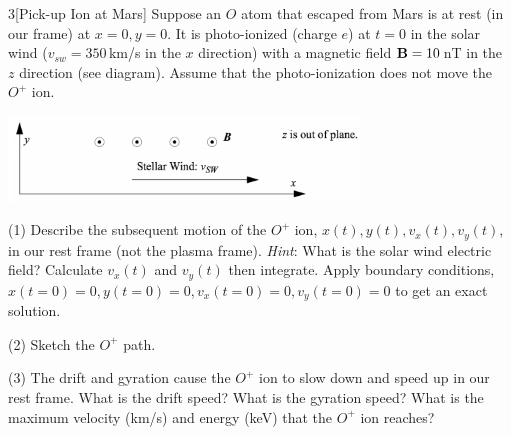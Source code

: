 \documentclass[12pt]{article}
\begin{document}
\begin{problem}{3}[Pick-up Ion at Mars]
Suppose an $O$ atom that escaped from Mars is at rest (in our frame) at
$x=0,y=0$. It is photo-ionized (charge $e$) at $t=0$ in the solar wind
($v_{sw}=350$\,\si{km/s} in the $x$ direction) with a magnetic field
$\vb{B}=10$\,\si{nT} in the $z$ direction (see diagram). Assume that the
photo-ionization does not move the $O^+$ ion.
\begin{center}
    \includegraphics[width=0.7\textwidth]{hw2_p3.jpg} 
\end{center}

(1) Describe the subsequent motion of the $O^+$ ion, $x(t),y(t),v_x(t),v_y(t)$,
in our rest frame (not the plasma frame). \textit{Hint}: What is the solar wind
electric field? Calculate $v_x(t)$ and $v_y(t)$ then integrate. Apply boundary
conditions, $x(t=0)=0,y(t=0)=0,v_x(t=0)=0,v_y(t=0)=0$ to get an exact solution.

(2) Sketch the $O^+$ path.

(3) The drift and gyration cause the $O^+$ ion to slow down and speed up in our
rest frame. What is the drift speed? What is the gyration speed? What is the
maximum velocity (\si{km/s}) and energy (\si{keV}) that the $O^+$ ion reaches?


\end{problem}
\end{document}
